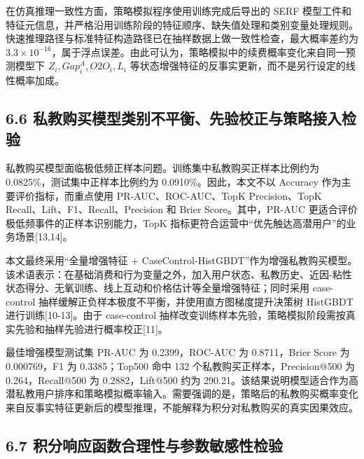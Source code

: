 \documentclass[
  12pt,
]{ctexart}
\begin{document}
在仿真推理一致性方面，策略模拟程序使用训练完成后导出的 SERF 模型工件和特征元信息，并严格沿用训练阶段的特征顺序、缺失值处理和类别变量处理规则。快速推理路径与标准特征构造路径已在抽样数据上做一致性检查，最大概率差约为 \(3.3\times10^{-16}\)，属于浮点误差。由此可认为，策略模拟中的续费概率变化来自同一预测模型下 \(Z_i,Gap_i^A,O2O_i,L_i\) 等状态增强特征的反事实更新，而不是另行设定的线性概率加成。

\hypertarget{ux79c1ux6559ux8d2dux4e70ux6a21ux578bux7c7bux522bux4e0dux5e73ux8861ux5148ux9a8cux6821ux6b63ux4e0eux7b56ux7565ux63a5ux5165ux68c0ux9a8c}{%
\subsection{6.6 私教购买模型类别不平衡、先验校正与策略接入检验}\label{ux79c1ux6559ux8d2dux4e70ux6a21ux578bux7c7bux522bux4e0dux5e73ux8861ux5148ux9a8cux6821ux6b63ux4e0eux7b56ux7565ux63a5ux5165ux68c0ux9a8c}}

私教购买模型面临极低频正样本问题。训练集中私教购买正样本比例约为 0.0825\%，测试集中正样本比例约为 0.0910\%。因此，本文不以 Accuracy 作为主要评价指标，而重点使用 PR-AUC、ROC-AUC、TopK Precision、TopK Recall、Lift、F1、Recall、Precision 和 Brier Score。其中，PR-AUC 更适合评价极低频事件的正样本识别能力，TopK 指标更符合运营中``优先触达高潜用户''的业务场景{[}13,14{]}。

本文最终采用``全量增强特征 + CaseControl-HistGBDT''作为增强私教购买模型。该术语表示：在基础消费和行为变量之外，加入用户状态、私教历史、近因-粘性状态得分、无氧训练、线上互动和价格估计等全量增强特征；同时采用 case-control 抽样缓解正负样本极度不平衡，并使用直方图梯度提升决策树 HistGBDT 进行训练{[}10-13{]}。由于 case-control 抽样改变训练样本先验，策略模拟阶段需按真实先验和抽样先验进行概率校正{[}11{]}。

最佳增强模型测试集 PR-AUC 为 0.2399，ROC-AUC 为 0.8711，Brier Score 为 0.000769，F1 为 0.3385；Top500 命中 132 个私教购买正样本，Precision@500 为 0.264，Recall@500 为 0.2882，Lift@500 约为 290.21。该结果说明模型适合作为高潜私教用户排序和策略模拟概率输入。需要强调的是，策略后的私教购买概率变化来自反事实特征更新后的模型推理，不能解释为积分对私教购买的真实因果效应。

\hypertarget{ux79efux5206ux54cdux5e94ux51fdux6570ux5408ux7406ux6027ux4e0eux53c2ux6570ux654fux611fux6027ux68c0ux9a8c}{%
\subsection{6.7 积分响应函数合理性与参数敏感性检验}\label{ux79efux5206ux54cdux5e94ux51fdux6570ux5408ux7406ux6027ux4e0eux53c2ux6570ux654fux611fux6027ux68c0ux9a8c}}
\end{document}
